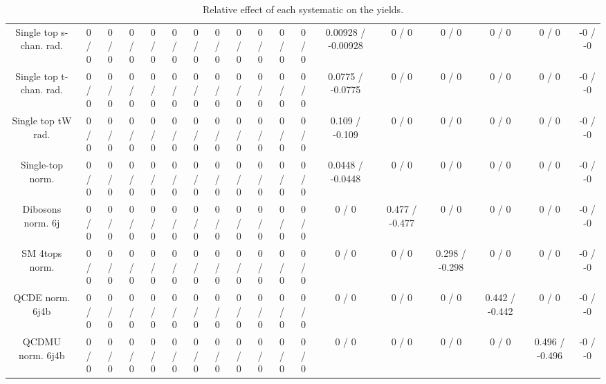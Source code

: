 \documentclass[10pt]{article}
\begin{document}
\begin{table}[htbp]
\begin{center}
\begin{tabular}{|c|c|c|c|c|c|c|c|c|c|c|c|c|c|c|c|c|c|}
  Single top s-chan. rad. & 0 / 0 & 0 / 0 & 0 / 0 & 0 / 0 & 0 / 0 & 0 / 0 & 0 / 0 & 0 / 0 & 0 / 0 & 0 / 0 & 0 / 0 & 0.00928 / -0.00928 & 0 / 0 & 0 / 0 & 0 / 0 & 0 / 0 & -0 / -0 \\ 
  Single top t-chan. rad. & 0 / 0 & 0 / 0 & 0 / 0 & 0 / 0 & 0 / 0 & 0 / 0 & 0 / 0 & 0 / 0 & 0 / 0 & 0 / 0 & 0 / 0 & 0.0775 / -0.0775 & 0 / 0 & 0 / 0 & 0 / 0 & 0 / 0 & -0 / -0 \\ 
  Single top tW rad. & 0 / 0 & 0 / 0 & 0 / 0 & 0 / 0 & 0 / 0 & 0 / 0 & 0 / 0 & 0 / 0 & 0 / 0 & 0 / 0 & 0 / 0 & 0.109 / -0.109 & 0 / 0 & 0 / 0 & 0 / 0 & 0 / 0 & -0 / -0 \\ 
  Single-top norm. & 0 / 0 & 0 / 0 & 0 / 0 & 0 / 0 & 0 / 0 & 0 / 0 & 0 / 0 & 0 / 0 & 0 / 0 & 0 / 0 & 0 / 0 & 0.0448 / -0.0448 & 0 / 0 & 0 / 0 & 0 / 0 & 0 / 0 & -0 / -0 \\ 
  Dibosons norm. 6j & 0 / 0 & 0 / 0 & 0 / 0 & 0 / 0 & 0 / 0 & 0 / 0 & 0 / 0 & 0 / 0 & 0 / 0 & 0 / 0 & 0 / 0 & 0 / 0 & 0.477 / -0.477 & 0 / 0 & 0 / 0 & 0 / 0 & -0 / -0 \\ 
  SM 4tops norm. & 0 / 0 & 0 / 0 & 0 / 0 & 0 / 0 & 0 / 0 & 0 / 0 & 0 / 0 & 0 / 0 & 0 / 0 & 0 / 0 & 0 / 0 & 0 / 0 & 0 / 0 & 0.298 / -0.298 & 0 / 0 & 0 / 0 & -0 / -0 \\ 
  QCDE norm. 6j4b & 0 / 0 & 0 / 0 & 0 / 0 & 0 / 0 & 0 / 0 & 0 / 0 & 0 / 0 & 0 / 0 & 0 / 0 & 0 / 0 & 0 / 0 & 0 / 0 & 0 / 0 & 0 / 0 & 0.442 / -0.442 & 0 / 0 & -0 / -0 \\ 
  QCDMU norm. 6j4b & 0 / 0 & 0 / 0 & 0 / 0 & 0 / 0 & 0 / 0 & 0 / 0 & 0 / 0 & 0 / 0 & 0 / 0 & 0 / 0 & 0 / 0 & 0 / 0 & 0 / 0 & 0 / 0 & 0 / 0 & 0.496 / -0.496 & -0 / -0 \\ 
\hline 
\end{tabular} 
\caption{Relative effect of each systematic on the yields.} 
\end{center} 
\end{table} 
\end{document}
